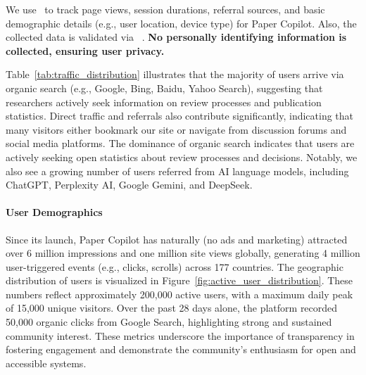 We use~\citet{googleanalytics} to track page views, session durations, referral sources, and basic demographic details (e.g., user location, device type) for Paper Copilot. Also, the collected data is validated via ~\citet{matomo}. \textbf{No personally identifying information is collected, ensuring user privacy.}


Table~\ref{tab:traffic_distribution} illustrates that the majority of users arrive via organic search (e.g., Google, Bing, Baidu, Yahoo Search), suggesting that researchers actively seek information on review processes and publication statistics. Direct traffic and referrals also contribute significantly, indicating that many visitors either bookmark our site or navigate from discussion forums and social media platforms. The dominance of organic search indicates that users are actively seeking open statistics about review processes and decisions. Notably, we also see a growing number of users referred from AI language models, including ChatGPT, Perplexity AI, Google Gemini, and DeepSeek.

\paragraph{User Demographics} 
Since its launch, Paper Copilot has naturally (no ads and marketing) attracted over 6 million impressions and one million site views globally, generating 4 million user-triggered events (e.g., clicks, scrolls) across 177 countries. The geographic distribution of users is visualized in Figure~\ref{fig:active_user_distribution}. These numbers reflect approximately 200,000 active users, with a maximum daily peak of 15,000 unique visitors. Over the past 28 days alone, the platform recorded 50,000 organic clicks from Google Search, highlighting strong and sustained community interest. These metrics underscore the importance of transparency in fostering engagement and demonstrate the community’s enthusiasm for open and accessible systems.


